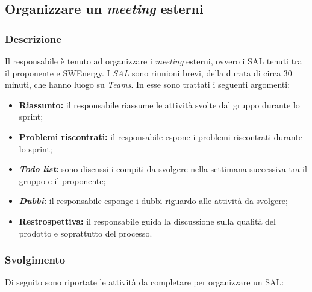\subsection{Organizzare un \textit{meeting} esterni}
\label{organizzare-meeting-esterno}

\subsubsection{Descrizione}
Il responsabile è tenuto ad organizzare i \textit{meeting} esterni, ovvero i SAL
tenuti tra il proponente e SWEnergy.
I \textit{SAL} sono riunioni brevi, della durata di circa 30 minuti, che hanno
luogo su \textit{Teams}. In esse
sono trattati i seguenti argomenti:
\begin{itemize}
	\item \textbf{Riassunto:} il responsabile riassume le attività svolte dal
	      gruppo durante lo sprint;

	\item \textbf{Problemi riscontrati:} il responsabile espone i problemi
	      riscontrati durante lo sprint;

	\item \textbf{\textit{Todo list}:} sono discussi i compiti da svolgere nella
	      settimana successiva tra il gruppo e il proponente;

	\item \textbf{\textit{Dubbi}:} il responsabile esponge i dubbi riguardo alle
	      attività da svolgere;

	\item \textbf{Restrospettiva:} il responsabile guida la discussione sulla
	      qualità del prodotto e soprattutto del processo.
\end{itemize}

\subsubsection{Svolgimento}
Di seguito sono riportate le attività da completare per organizzare un SAL:

